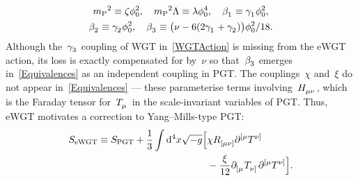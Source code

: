 \documentclass[aps,prd,reprint,preprintnumbers,showpacs,floatfix,nofootinbib,superscript address]{revtex4-2}
\begin{document}
\begin{equation}\label{Equivalences}
	\begin{gathered}
		\MPl{}^2\equiv \zeta\phi_0^2,\quad \MPl{}^2\Lambda\equiv\lambda\phi_0^4,\quad \Bet{1}\equiv\Gam{1}\phi_0^2,\\
		\Bet{2}\equiv\Gam{2}\phi_0^2,\quad \Bet{3}\equiv\big(\nu-6(2\Gam{1}+\Gam{2})\big)\phi_0^2/18.
	\end{gathered}
\end{equation}
Although the~$\Gam{3}$ coupling of WGT in~\cref{WGTAction} is missing from the eWGT action, its loss is exactly compensated for by~$\nu$ so that~$\Bet{3}$ emerges in~\cref{Equivalences} as an independent coupling in PGT. The couplings~$\chi$ and~$\xi$ do not appear in~\cref{Equivalences} --- these parameterise terms involving~$\MAGH{_{\mu\nu}}$, which is the Faraday tensor for~$\MAGT{_\mu}$ in the scale-invariant variables of PGT. Thus, eWGT motivates a correction to Yang--Mills-type PGT:
\begin{align}\label{eWGTAction}
	S_{\text{eWGT}}\equiv S_{\text{PGT}}
	+\frac{1}{3}\int\mathrm{d}^4x\sqrt{-g}\Big[&
	\chi\MAGF{_{[\mu\nu]}}\PD{^{[\mu}}\MAGT{^{\nu]}}
	\nonumber\\&
	-\frac{\xi}{12}\PD{_{[\mu}}\MAGT{_{\nu]}}\PD{^{[\mu}}\MAGT{^{\nu]}}
	\Big].
\end{align}
\end{document}
